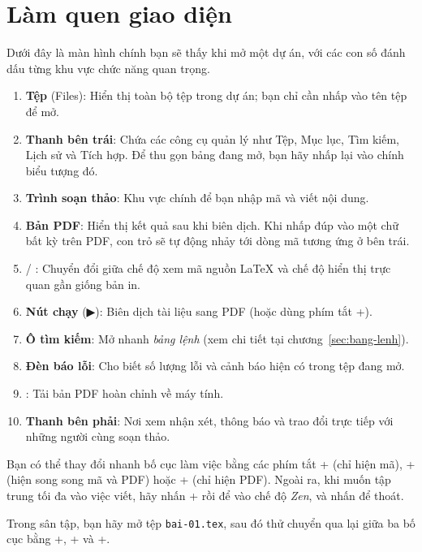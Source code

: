 \section{Làm quen giao diện}
\label{sec:giao-dien}

Dưới đây là màn hình chính bạn sẽ thấy khi mở một dự án, với các con số đánh
dấu từng khu vực chức năng quan trọng.


\begin{enumerate}
  \item \textbf{Tệp} (Files): Hiển thị toàn bộ tệp trong dự án; bạn chỉ cần
    nhấp vào tên tệp để mở.
  \item \textbf{Thanh bên trái}: Chứa các công cụ quản lý như Tệp, Mục lục, Tìm
    kiếm, Lịch sử và Tích hợp. Để thu gọn bảng đang mở, bạn hãy nhấp lại vào
    chính biểu tượng đó.
  \item \textbf{Trình soạn thảo}: Khu vực chính để bạn nhập mã và viết nội
    dung.
  \item \textbf{Bản PDF}: Hiển thị kết quả sau khi biên dịch. Khi nhấp đúp vào
    một chữ bất kỳ trên PDF, con trỏ sẽ tự động nhảy tới dòng mã tương ứng ở
    bên trái.
  \item {} / : Chuyển đổi giữa chế độ xem mã nguồn
    \LaTeX{} và chế độ hiển thị trực quan gần giống bản in.
  \item \textbf{Nút chạy} (▶): Biên dịch tài liệu sang PDF (hoặc dùng phím tắt
    +).
  \item \textbf{Ô tìm kiếm}: Mở nhanh \emph{bảng lệnh} (xem chi tiết tại
    chương~\ref{sec:bang-lenh}).
  \item \textbf{Đèn báo lỗi}: Cho biết số lượng lỗi và cảnh báo hiện có trong
    tệp đang mở.
  \item {}: Tải bản PDF hoàn chỉnh về máy tính.
  \item \textbf{Thanh bên phải}: Nơi xem nhận xét, thông báo và trao đổi trực
    tiếp với những người cùng soạn thảo.
\end{enumerate}

\begin{meo}
Bạn có thể thay đổi nhanh bố cục làm việc bằng các phím tắt
+ (chỉ hiện mã), + (hiện song song mã và
PDF) hoặc + (chỉ hiện PDF). Ngoài ra, khi muốn tập trung tối
đa vào việc viết, hãy nhấn + rồi  để vào chế độ
\emph{Zen}, và nhấn  để thoát.
\end{meo}

\begin{thuchanh}
Trong sân tập, bạn hãy mở tệp \texttt{bai-01.tex}, sau đó thử chuyển qua lại
giữa ba bố cục bằng +, + và
+.
\end{thuchanh}